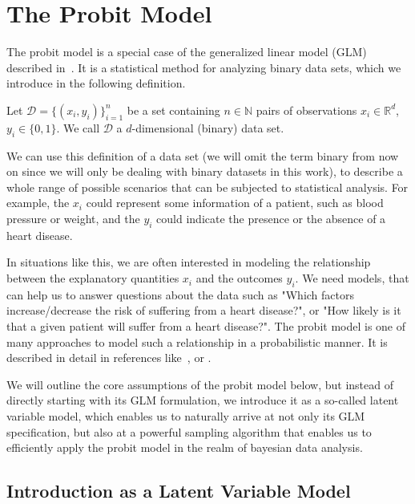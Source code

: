 \section{The Probit Model}

The probit model is a special case of the generalized linear model (GLM)
described in~\cite{glm-nelder}.
It is a statistical method for analyzing binary data sets,
which we introduce in the following definition.

\begin{definition}
    Let $\mathcal{D} = \{(x_i, y_i)\}_{i=1}^n$ be a set containing
    $n \in \mathbb{N}$ pairs of observations $x_i \in \mathbb{R}^d$,
    $y_i \in \{0, 1\}$.
    We call $\mathcal{D}$ a $d$-dimensional (binary) data set.
\end{definition}

\noindent We can use this definition of a data set
(we will omit the term binary from now on since we will only be dealing
with binary datasets in this work), to describe a whole range of possible scenarios
that can be subjected to statistical analysis.
For example, the $x_i$ could represent some information of a patient, such as
blood pressure or weight, and the $y_i$ could indicate the presence or
the absence of a heart disease.

In situations like this, we are often interested in modeling the
relationship between the explanatory quantities $x_i$ and the
outcomes $y_i$.
We need models, that can help us to answer questions about the data
such as "Which factors increase/decrease the risk of suffering from a heart disease?",
or "How likely is it that a given patient will suffer from a heart disease?".
The probit model is one of many approaches to model such a
relationship in a probabilistic manner.
It is described in detail in references like~\cite{glm-nelder},
\cite{glm-agresti} or \cite{regression-fahrmeir}.

We will outline the core assumptions of the probit model below,
but instead of directly starting with its GLM formulation, we introduce
it as a so-called latent variable model, which enables us to
naturally arrive at not only its GLM specification, but also
at a powerful sampling algorithm that enables us to efficiently apply
the probit model in the realm of bayesian data analysis.

\subsection{Introduction as a Latent Variable Model}
\label{sec:probit-introduction}

